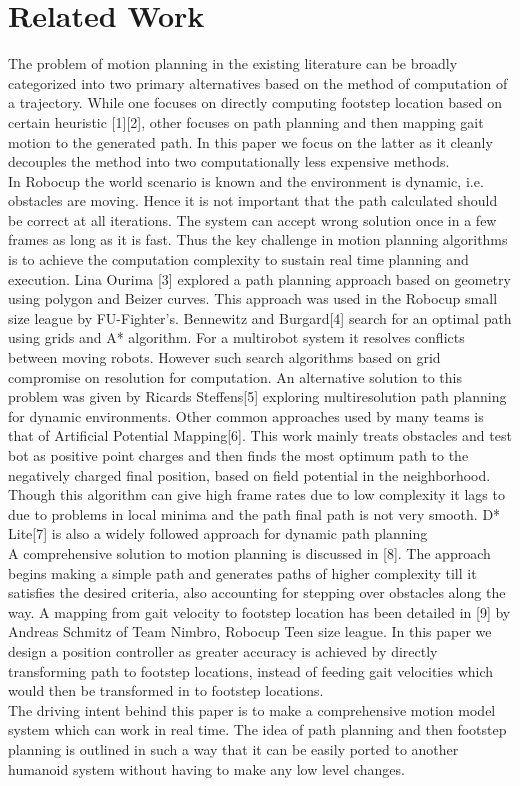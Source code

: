 \documentclass[letterpaper, 10 pt, conference]{ieeeconf}  %
\begin{document}
\section{Related Work}
The problem of motion planning in the existing literature can be broadly categorized into two primary alternatives based on the method of computation of a trajectory. While one focuses on directly computing footstep location based on certain heuristic [1][2], other focuses on path planning and then mapping gait motion to the generated path. In this paper we focus on the latter as it cleanly decouples the method into two computationally less expensive methods.\\
In Robocup the world scenario is known and the environment is dynamic, i.e. obstacles are moving. Hence it is not important that the path calculated should be correct at all iterations. The system can accept wrong solution once in a few frames as long as it is fast. Thus the key challenge in motion planning algorithms is to achieve the computation complexity to sustain real time planning and execution.
Lina Ourima [3] explored a path planning approach based on geometry using polygon and Beizer curves. This approach was used in the Robocup small size league by FU-Fighter's. Bennewitz and Burgard[4] search for an optimal path using grids and A* algorithm. For a multirobot system it resolves conflicts between moving robots. However such search algorithms based on grid compromise on resolution for computation. An alternative solution to this problem was given by Ricards Steffens[5] exploring multiresolution path planning for dynamic environments. Other common approaches used by many teams is that of Artificial Potential Mapping[6]. This work mainly treats obstacles and test bot as positive point charges and then finds the most optimum path to the negatively charged final position, based on field potential in the neighborhood. Though this algorithm can give high frame rates due to low complexity it lags to due to problems in local minima and the path final path is not very smooth. D* Lite[7] is also a widely followed approach for dynamic path planning\\
A comprehensive solution to motion planning is discussed in [8]. The approach begins making a simple path and generates paths of higher complexity till it satisfies the desired criteria, also accounting for stepping over obstacles along the way. A mapping from gait velocity to footstep location has been detailed in [9] by Andreas Schmitz of Team Nimbro, Robocup Teen size league. In this paper we design a position controller as greater accuracy is achieved by directly transforming path to footstep locations, instead of feeding gait velocities which would then be transformed in to footstep locations.\\
The driving intent behind this paper is to make a comprehensive motion model system which can work in real time. The idea of path planning and then footstep planning is outlined in such a way that it can be easily ported to another humanoid system without having to make any low level changes.
\end{document}
